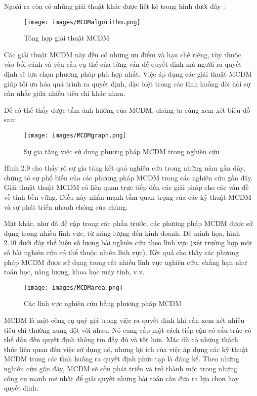 Ngoài ra còn có những giải thuật khác được liệt kê trong hình dưới đây : 

\begin{figure}[H]
    \centering
    \texttt{[image: images/MCDMalgorithm.png]}
    \vspace{0.6cm}
    \caption{Tổng hợp giải thuật MCDM \cite{pijush}}
\end{figure}

Các giải thuật MCDM này đều có những ưu điểm và hạn chế riêng, tùy thuộc vào bối cảnh và yêu cầu cụ thể của từng vấn đề quyết định mà người ra quyết định sẽ lựa chọn phương pháp phù hợp nhất. Việc áp dụng các giải thuật MCDM giúp tối ưu hóa quá trình ra quyết định, đặc biệt trong các tình huống đòi hỏi sự cân nhắc giữa nhiều tiêu chí khác nhau. 

Để có thể thấy được tầm ảnh hưởng của MCDM, chúng ta cùng xem xét biểu đồ sau: 
\begin{figure}[H]
    \centering
    \texttt{[image: images/MCDMgraph.png]}
    \vspace{0.6cm}
    \caption{Sự gia tăng việc sử dụng phương pháp MCDM trong nghiên cứu}
\end{figure}

Hình 2.9 cho thấy rõ sự gia tăng kết quả nghiên cứu trong những năm gần đây, chứng tỏ sự phổ biến của các phương pháp MCDM trong các nghiên cứu gần đây. Giải thuật thuật MCDM có liên quan trực tiếp đến các giải pháp cho các vấn đề về tính bền vững. Điều này nhấn mạnh tầm quan trọng của các kỹ thuật MCDM và sự phát triển nhanh chóng của chúng. 

Mặt khác, như đã đề cập trong các phần trước, các phương pháp MCDM được sử dụng trong nhiều lĩnh vực, từ năng lượng đến kinh doanh. Để minh họa, hình 2.10 dưới đây thể hiện số lượng bài nghiên cứu theo lĩnh vực (xét trường hợp một số bài nghiên cứu có thể thuộc nhiều lĩnh vực). Kết quả cho thấy các phương pháp MCDM được sử dụng trong rất nhiều lĩnh vực nghiên cứu, chẳng hạn như toán học, năng lượng, khoa học máy tính, v.v.
\begin{figure}[H]
    \centering
    \texttt{[image: images/MCDMarea.png]}
    \vspace{0.6cm}
    \caption{Các lĩnh vực nghiên cứu bằng phương pháp MCDM}
\end{figure}

MCDM là một công cụ quý giá trong việc ra quyết định khi cần xem xét nhiều tiêu chí thường xung đột với nhau. Nó cung cấp một cách tiếp cận có cấu trúc có thể dẫn đến quyết định thông tin đầy đủ và tốt hơn. Mặc dù có những thách thức liên quan đến việc sử dụng nó, nhưng lợi ích của việc áp dụng các kỹ thuật MCDM trong các tình huống ra quyết định phức tạp là đáng kể. Theo những nghiên cứu gần đây, MCDM sẽ còn phát triển và trở thành một trong những công cụ mạnh mẽ nhất để giải quyết những bài toán cần đưa ra lựa chọn hay quyết định.

